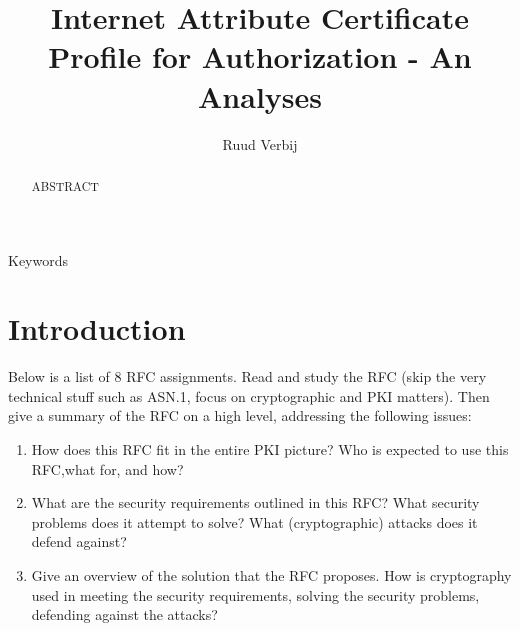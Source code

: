 \documentclass[10pt,conference,a4paper]{IEEEtran}
\title{Internet Attribute Certificate Profile for Authorization - An Analyses}
\author{Ruud Verbij}
\begin{document}
\maketitle

\begin{abstract}
ABSTRACT
\end{abstract}

\begin{IEEEkeywords}
Keywords
\end{IEEEkeywords}

\label{Introduction}
\section{Introduction}
Below is a list of 8 RFC assignments. Read and study the RFC (skip the very technical stuff such as ASN.1, focus on cryptographic and PKI matters). Then give a summary of the RFC on a high level, addressing the following issues:
\begin{enumerate}
	\item How does this RFC fit in the entire PKI picture? Who is expected to use this RFC,what for, and how?
	\item What are the security requirements outlined in this RFC? What security problems does it attempt to solve? What (cryptographic) attacks does it defend against?
	\item Give an overview of the solution that the RFC proposes. How is cryptography used in meeting the security requirements, solving the security problems, defending against the attacks?
\end{enumerate}


\end{document}
